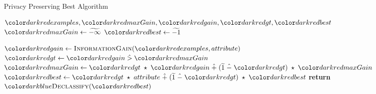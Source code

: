 \begin{algorithm}[H]
\caption{Privacy Preserving Best Algorithm}\label{a:id3-best-pp}
\begin{algorithmic}[1]
\Require $\red{examples}, \red{maxGain}, \red{gain}, \red{gt}, \red{best}$
    \State $\red{maxGain} \gets \enc{-\infty}$
    \State $\red{best} \gets \enc{-1}$

        \State $\red{gain} \gets  \textsc{InformationGain}(\red{examples}, attribute)$
        \State $\red{gt} \gets \red{gain} \hgt  \red{maxGain}$
        \State $\red{maxGain} \gets \red{gt} \hmul \red{gain} \hplus (\enc{1} \hminus \red{gt}) \hmul \red{maxGain}$ 
        \State $\red{best} \gets \red{gt} \hmul attribute \hplus (\enc{1} \hminus \red{gt}) \hmul \red{best}$
    \EndFor
    \State \textbf{return} ${\blue{\textsc{Declassify}}}(\red{best})$
\EndProcedure
\end{algorithmic}
\end{algorithm}